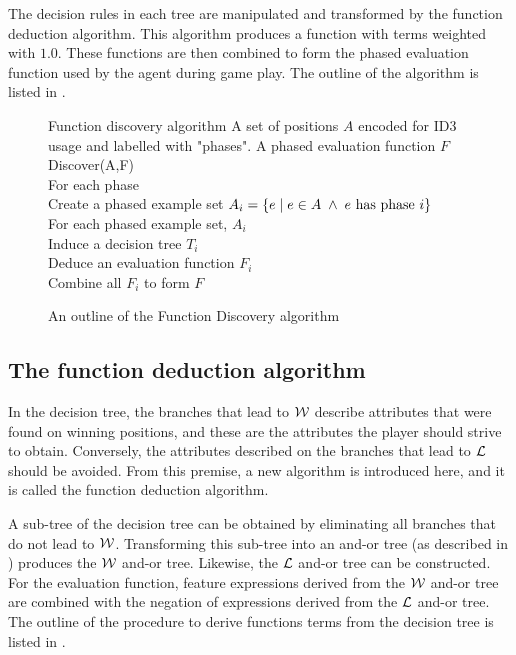 The decision rules in each tree are manipulated and transformed by the function deduction algorithm. This algorithm produces a function with terms weighted with $1.0$.  These functions are then combined to form the phased evaluation function used by the agent during game play.  The outline of the algorithm is listed in .  
\begin{figure}[!ht]
\begin{algorithm}
{Function discovery algorithm}
{A set of positions $A$ encoded for ID3 usage and labelled with "phases".}
{A phased evaluation function $F$} 
Discover(A,F) \+\\
For each phase \+ \\
 Create a phased example set $A_i = \{ e \; | \; e \in A \;\wedge\; e \mbox{ has phase } i \} $ \-\\
For each phased example set, $A_i$ \+ \\ 
 Induce a decision tree $T_i$ \\
 Deduce an evaluation function $F_i$\- \\
Combine all $F_i$ to form $F$ 
\end{algorithm}
\caption{An outline of the Function Discovery algorithm}
\label{alg:fd}	
\end{figure}

\subsection{The function deduction algorithm}
\label{sec:deduce_function}
In the decision tree, the branches that lead to ${\mathcal W}$ describe attributes that were found on winning positions, and these are the attributes the player should strive to obtain.  Conversely, the attributes described on the branches that lead to ${\mathcal L}$ should be avoided.  From this premise, a new  algorithm is introduced here, and it is called the function deduction algorithm.  

A sub-tree of the decision tree can be obtained by eliminating all branches that do not lead to ${\mathcal W}$. Transforming this sub-tree into an and-or tree (as described in ) produces the ${\mathcal W}$ and-or tree.  Likewise, the ${\mathcal L}$ and-or tree can be constructed.  For the evaluation function, feature expressions derived from the ${\mathcal W}$ and-or tree are combined with the negation of expressions derived from the ${\mathcal L}$ and-or tree.  The outline of the procedure to derive functions terms from the decision tree is listed in .    

